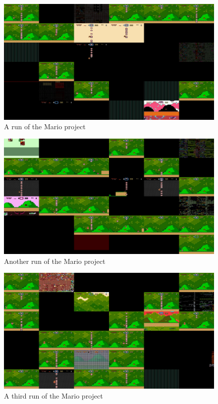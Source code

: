\documentclass{article}
\begin{document}
\begin{figure}[ht]
\centering
\includegraphics[width=\textwidth]{ma1}
\caption{A run of the Mario project}
\label{fig:ma1}
\end{figure}

\begin{figure}[ht]
\centering
\includegraphics[width=\textwidth]{ma2}
\caption{Another run of the Mario project}
\label{fig:ma2}
\end{figure}

\begin{figure}[ht]
\centering
\includegraphics[width=\textwidth]{ma3}
\caption{A third run of the Mario project}
\label{fig:ma3}
\end{figure}
\end{document}
